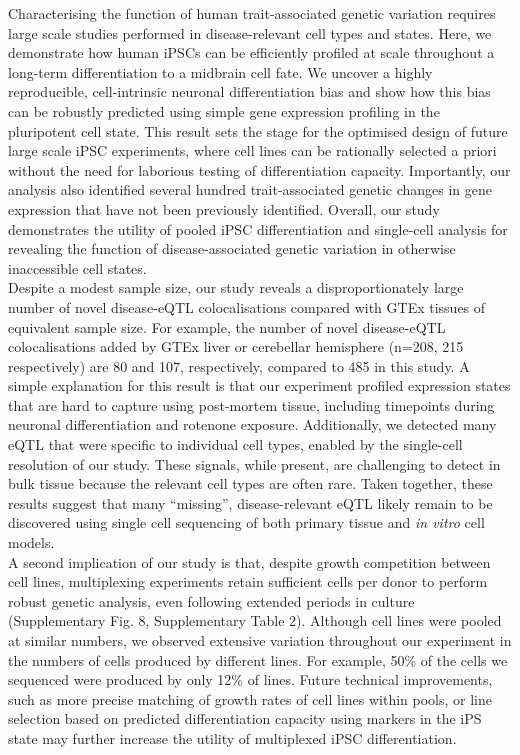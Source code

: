 

Characterising the function of human trait-associated genetic variation requires large scale studies performed in disease-relevant cell types and states. 
Here, we demonstrate how human iPSCs can be efficiently profiled at scale throughout a long-term differentiation to a midbrain cell fate. 
We uncover a highly reproducible, cell-intrinsic neuronal differentiation bias and show how this bias can be robustly predicted using simple gene expression profiling in the pluripotent cell state. 
This result sets the stage for the optimised design of future large scale iPSC experiments, where cell lines can be rationally selected a priori without the need for laborious testing of differentiation capacity. 
Importantly, our analysis also identified several hundred trait-associated genetic changes in gene expression that have not been previously identified. 
Overall, our study demonstrates the utility of pooled iPSC differentiation and single-cell analysis for revealing the function of disease-associated genetic variation in otherwise inaccessible cell states.\\

Despite a modest sample size, our study reveals a disproportionately large number of novel disease-eQTL colocalisations compared with GTEx tissues of equivalent sample size. 
For example, the number of novel disease-eQTL colocalisations added by GTEx liver or cerebellar hemisphere (n=208, 215 respectively) are 80 and 107, respectively, compared to 485 in this study. 
A simple explanation for this result is that our experiment profiled expression states that are hard to capture using post-mortem tissue, including timepoints during neuronal differentiation and rotenone exposure. 
Additionally, we detected many eQTL that were specific to individual cell types, enabled by the single-cell resolution of our study.
These signals, while present, are challenging to detect in bulk tissue because the relevant cell types are often rare. 
Taken together, these results suggest that many “missing”, disease-relevant eQTL likely remain to be discovered using single cell sequencing of both primary tissue and \textit{in vitro} cell models.\\

A second implication of our study is that, despite growth competition between cell lines, multiplexing experiments retain sufficient cells per donor to perform robust genetic analysis, even following extended periods in culture (Supplementary Fig. 8, Supplementary Table 2). 
Although cell lines were pooled at similar numbers, we observed extensive variation throughout our experiment in the numbers of cells produced by different lines. 
For example, 50\% of the cells we sequenced were produced by only 12\% of lines.
Future technical improvements, such as more precise matching of growth rates of cell lines within pools, or line selection based on predicted differentiation capacity using markers in the iPS state may further increase the utility of multiplexed iPSC differentiation.


